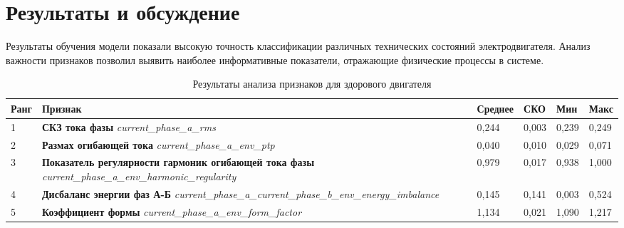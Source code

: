 \section{Результаты и обсуждение}

Результаты обучения модели показали высокую точность классификации различных технических состояний электродвигателя.  
Анализ важности признаков позволил выявить наиболее информативные показатели, отражающие физические процессы в системе.  

\renewcommand{\arraystretch}{1.3}

\begin{table}[htbp]
\centering
\caption{Результаты анализа признаков для здорового двигателя}
\label{tab:healthy_motor_features}
\begin{tabular}{p{1cm} p{6cm} p{1.5cm} p{1.5cm} p{1.5cm} p{1.5cm}}
\toprule
\textbf{Ранг} & 
\textbf{Признак} &
\textbf{Среднее} & 
\textbf{СКО} &
\textbf{Мин} &
\textbf{Макс} \\
\midrule

1 & 
\textbf{СКЗ тока фазы} \newline
\textit{current\_phase\_a\_rms} & 
0,244 & 0,003 & 0,239 & 0,249 \\
\midrule

2 & 
\textbf{Размах огибающей тока} \newline
\textit{current\_phase\_a\_env\_ptp} & 
0,040 & 0,010 & 0,029 & 0,071 \\
\midrule

3 & 
\textbf{Показатель регулярности гармоник огибающей тока фазы} \newline
\textit{current\_phase\_a\_env\_harmonic\_regularity} & 
0,979 & 0,017 & 0,938 & 1,000 \\
\midrule

4 & 
\textbf{Дисбаланс энергии фаз А-Б} \newline
\textit{current\_phase\_a\_current\_phase\_b\_env\_energy\_imbalance} & 
0,145 & 0,141 & 0,003 & 0,524 \\
\midrule

5 & 
\textbf{Коэффициент формы} \newline
\textit{current\_phase\_a\_env\_form\_factor} & 
1,134 & 0,021 & 1,090 & 1,217 \\

\bottomrule
\end{tabular}
\end{table}


